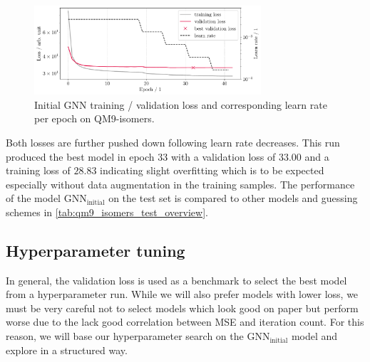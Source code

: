 \begin{figure}[H]
    \centering
    \includegraphics[width=0.75\textwidth]{../fig/gnn/MGNN_6-31G_NO_AUG_07_07_manual_ref_train_val_loss.pdf}
    \caption[Initial GNN loss on QM9-isomers]{Initial GNN training / validation loss and corresponding learn rate per epoch on QM9-isomers.}
    \label{fig:initial_train_qm9_isomers}
\end{figure}
Both losses are further pushed down following learn rate decreases. This run produced the best model in epoch 33 with a validation loss of $33.00$ and a training loss of $28.83$ indicating slight overfitting which is to be expected especially without data augmentation in the training samples. The performance of the model $\text{GNN}_\text{initial}$ on the test set is compared to other models and guessing schemes in \autoref{tab:qm9_isomers_test_overview}. 

\subsection{Hyperparameter tuning}
\label{subsec:qm9_isomers_hyperparamtuning}
In general, the validation loss is used as a benchmark to select the best model from a hyperparameter run. While we will also prefer models with lower loss, we must be very careful not to select models which look good on paper but perform worse due to the lack good correlation between MSE and iteration count. For this reason, we will base our hyperparameter search on the $\text{GNN}_\text{initial}$ model and explore in a structured way. 

